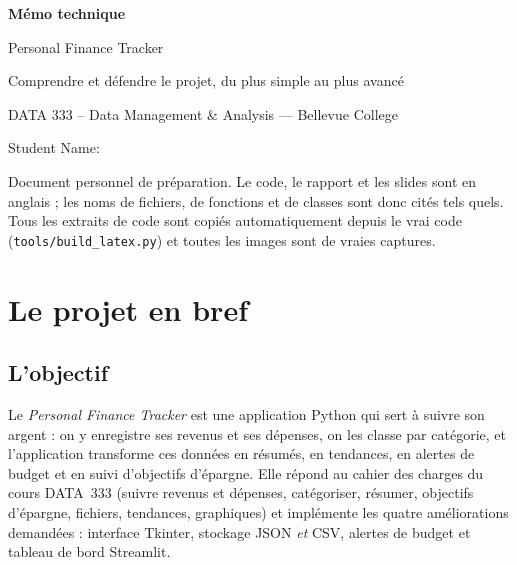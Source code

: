 \documentclass[11pt,a4paper]{article}
\newcommand{\code}[1]{{\NoAutoSpacing\texttt{#1}}}
\begin{document}
\begin{titlepage}
  \centering
  \vspace*{3cm}
  {\Huge\bfseries\color{accent} Mémo technique\par}
  \vspace{0.4cm}
  {\LARGE Personal Finance Tracker\par}
  \vspace{1cm}
  {\large Comprendre et défendre le projet, du plus simple au plus avancé\par}
  \vspace{2.4cm}
  {\large DATA 333 -- Data Management \& Analysis --- Bellevue College\par}
  \vspace{2cm}
  {\large Student Name: \StudentNameField\par}
  \vspace{0.5cm}
  {\large \SubmissionDate\par}
  \vfill
  {\small\color{muted} Document personnel de préparation. Le code, le rapport et les slides
   sont en anglais ; les noms de fichiers, de fonctions et de classes sont donc cités tels
   quels. Tous les extraits de code sont copiés automatiquement depuis le vrai code
   (\code{tools/build\_latex.py}) et toutes les images sont de vraies captures.\par}
\end{titlepage}

\tableofcontents
\newpage

\section{Le projet en bref}

\subsection{L'objectif}
Le \emph{Personal Finance Tracker} est une application Python qui sert à suivre son argent :
on y enregistre ses revenus et ses dépenses, on les classe par catégorie, et l'application
transforme ces données en résumés, en tendances, en alertes de budget et en suivi
d'objectifs d'épargne. Elle répond au cahier des charges du cours DATA~333 (suivre revenus et
dépenses, catégoriser, résumer, objectifs d'épargne, fichiers, tendances, graphiques) et
implémente les quatre améliorations demandées : interface Tkinter, stockage JSON \emph{et}
CSV, alertes de budget et tableau de bord Streamlit.
\end{document}
